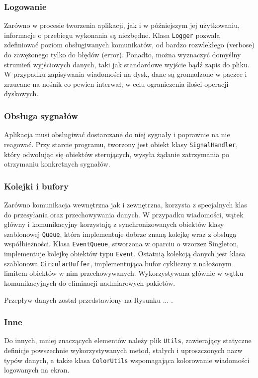 \subsubsection{Logowanie}

Zarówno w procesie tworzenia aplikacji, jak i w późniejszym jej użytkowaniu, informacje o przebiegu wykonania są niezbędne. Klasa {\tt Logger} pozwala zdefiniować poziom obsługiwanych komunikatów, od bardzo rozwlekłego (verbose) do zawężonego tylko do błędów (error). Ponadto, można wyznaczyć domyślny strumień wyjściowych danych, taki jak standardowe wyjście bądź zapis do pliku. W przypadku zapisywania wiadomości na dysk, dane są gromadzone w paczce i zrzucane na nośnik co pewien interwał, w celu ograniczenia ilości operacji dyskowych.

\subsubsection{Obsługa sygnałów}

Aplikacja musi obsługiwać dostarczane do niej sygnały i poprawnie na nie reagować. Przy starcie programu, tworzony jest obiekt klasy {\tt SignalHandler}, który odwołując się obiektów sterujących, wysyła żądanie zatrzymania po otrzymaniu konkretnych sygnałów.

\subsubsection{Kolejki i bufory}

Zarówno komunikacja wewnętrzna jak i zewnętrzna, korzysta z specjalnych klas do przesyłania oraz przechowywania danych. W przypadku wiadomości, wątek główny i komunikacyjny korzystają z synchronizowanych obiektów klasy szablonowej {\tt Queue}, która implementuje dobrze znaną kolejkę wraz z obslugą współbieżności. Klasa {\tt EventQueue}, stworzona w oparciu o wzorzez Singleton, implementuje kolejkę obiektów typu {\tt Event}. Ostatnią kolekcją danych jest klasa szablonowa {\tt CircularBuffer}, implementująca bufor cykliczny z nałożonym limitem obiektów w nim przechowywanych. Wykorzystywana głównie w wątku komunikacyjnych do eliminacji nadmiarowych pakietów.

Przepływ danych został przedstawiony na Rysunku ... .


\subsubsection{Inne}

Do innych, mniej znaczących elementów należy plik {\tt Utils}, zawierający statyczne definicje powszechnie wykorzystywanych metod, stałych i uproszczonych nazw typów danych, a także klasa {\tt ColorUtils} wspomagająca kolorowanie wiadomości logowanych na ekran.
